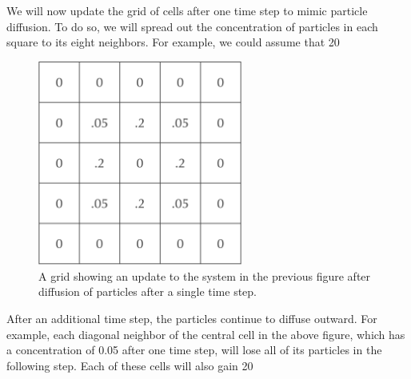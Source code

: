 {We will now update the grid of cells after one time step to mimic particle diffusion. To do so, we will spread out the concentration of particles in each square to its eight neighbors. For example, we could assume that 20%

\begin{figure}[h]
\centering
\mySfFamily
\includegraphics[width = 0.6\textwidth]{../images/A_concentration_one_time_step.png}
\caption{A grid showing an update to the system in the previous figure after diffusion of particles after a single time step.}
\label{fig:A_concentration_one_time_step}
\end{figure}

\begin{note}\end{note}

After an additional time step, the particles continue to diffuse outward. For example, each diagonal neighbor of the central cell in the above figure, which has a concentration of 0.05 after one time step, will lose all of its particles in the following step. Each of these cells will also gain 20%

}
